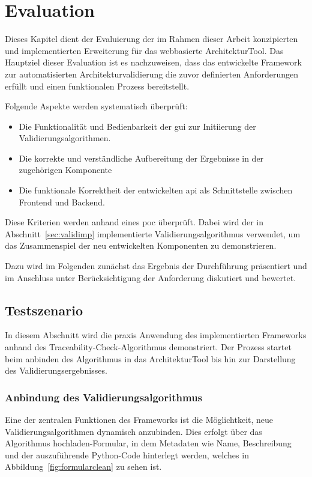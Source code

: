
\chapter{Evaluation}
\label{sect:evaluation}

Dieses Kapitel dient der Evaluierung der im Rahmen dieser Arbeit konzipierten und implementierten Erweiterung für das webbasierte ArchitekturTool. Das Hauptziel dieser Evaluation ist es nachzuweisen, dass das entwickelte Framework zur automatisierten Architekturvalidierung die zuvor definierten Anforderungen erfüllt und einen funktionalen Prozess bereitstellt.

Folgende Aspekte werden systematisch überprüft:
\begin{itemize}
  \item Die Funktionalität und Bedienbarkeit der \gls{gui} zur Initiierung der Validierungsalgorithmen.
  \item Die korrekte und verständliche Aufbereitung der Ergebnisse in der zugehörigen Komponente
  \item Die funktionale Korrektheit der entwickelten \gls{api} als Schnittstelle zwischen Frontend und Backend.
\end{itemize}

Diese Kriterien werden anhand eines \gls{poc} überprüft. Dabei wird der in Abschnitt~\ref{sec:validimp} implementierte Validierungsalgorithmus verwendet, um das Zusammenspiel der neu entwickelten Komponenten zu demonstrieren.

Dazu wird im Folgenden zunächst   das Ergebnis der Durchführung präsentiert und im Anschluss unter Berücksichtigung der Anforderung diskutiert und bewertet.

\section{Testszenario}
\label{sec:testszenario}

In diesem Abschnitt wird die praxis Anwendung des implementierten Frameworks anhand des Traceability-Check-Algorithmus demonstriert. Der Prozess startet beim anbinden des Algorithmus in das ArchitekturTool bis hin zur Darstellung des Validierungsergebnisses.

\subsection{Anbindung des Validierungsalgorithmus}
Eine der zentralen Funktionen des Frameworks ist die Möglichtkeit, neue Validierungsalgorithmen dynamisch anzubinden. Dies erfolgt über das \glqq Algorithmus hochladen\grqq{}-Formular, in dem Metadaten wie Name, Beschreibung und der auszuführende Python-Code hinterlegt werden, welches in Abbildung~\ref{fig:formularclean} zu sehen ist.

